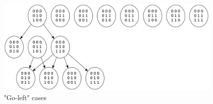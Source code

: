 \documentclass[11pt, a4paper]{article}
\theoremstyle{plain}
\theoremstyle{definition}
\theoremstyle{remark}
\begin{document}
\begin{figure}
\includegraphics[scale=0.50, angle=90]{graph_leftmost_left.jpg}
\caption{"Go-left" cases}
\label{graph:leftmost_left}
\end{figure}
\end{document}
